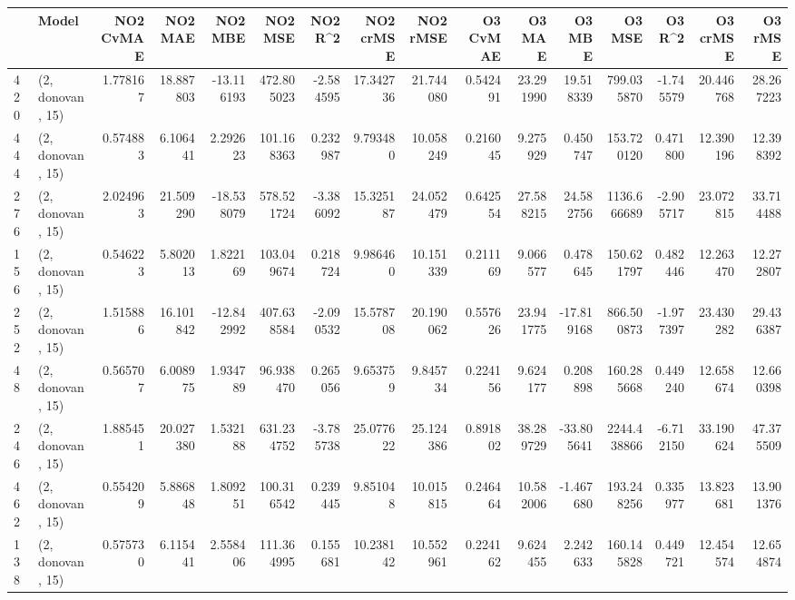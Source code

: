 \begin{tabular}{llrrrrrrrrrrrrrr}
\toprule
{} &             Model &  NO2 CvMAE &    NO2 MAE &    NO2 MBE &      NO2 MSE &    NO2 R\textasciicircum2 &  NO2 crMSE &   NO2 rMSE &  O3 CvMAE &     O3 MAE &     O3 MBE &       O3 MSE &     O3 R\textasciicircum2 &   O3 crMSE &    O3 rMSE \\
\midrule
420 &  (2, donovan, 15) &   1.778167 &  18.887803 & -13.116193 &   472.805023 &  -2.584595 &  17.342736 &  21.744080 &  0.542491 &  23.291990 &  19.518339 &   799.035870 &  -1.745579 &  20.446768 &  28.267223 \\
444 &  (2, donovan, 15) &   0.574883 &   6.106441 &   2.292623 &   101.168363 &   0.232987 &   9.793480 &  10.058249 &  0.216045 &   9.275929 &   0.450747 &   153.720120 &   0.471800 &  12.390196 &  12.398392 \\
276 &  (2, donovan, 15) &   2.024963 &  21.509290 & -18.538079 &   578.521724 &  -3.386092 &  15.325187 &  24.052479 &  0.642554 &  27.588215 &  24.582756 &  1136.666689 &  -2.905717 &  23.072815 &  33.714488 \\
156 &  (2, donovan, 15) &   0.546223 &   5.802013 &   1.822169 &   103.049674 &   0.218724 &   9.986460 &  10.151339 &  0.211169 &   9.066577 &   0.478645 &   150.621797 &   0.482446 &  12.263470 &  12.272807 \\
252 &  (2, donovan, 15) &   1.515886 &  16.101842 & -12.842992 &   407.638584 &  -2.090532 &  15.578708 &  20.190062 &  0.557626 &  23.941775 & -17.819168 &   866.500873 &  -1.977397 &  23.430282 &  29.436387 \\
48  &  (2, donovan, 15) &   0.565707 &   6.008975 &   1.934789 &    96.938470 &   0.265056 &   9.653759 &   9.845734 &  0.224156 &   9.624177 &   0.208898 &   160.285668 &   0.449240 &  12.658674 &  12.660398 \\
246 &  (2, donovan, 15) &   1.885451 &  20.027380 &   1.532188 &   631.234752 &  -3.785738 &  25.077622 &  25.124386 &  0.891802 &  38.289729 & -33.805641 &  2244.438866 &  -6.712150 &  33.190624 &  47.375509 \\
462 &  (2, donovan, 15) &   0.554209 &   5.886848 &   1.809251 &   100.316542 &   0.239445 &   9.851048 &  10.015815 &  0.246464 &  10.582006 &  -1.467680 &   193.248256 &   0.335977 &  13.823681 &  13.901376 \\
138 &  (2, donovan, 15) &   0.575730 &   6.115441 &   2.558406 &   111.364995 &   0.155681 &  10.238142 &  10.552961 &  0.224162 &   9.624455 &   2.242633 &   160.145828 &   0.449721 &  12.454574 &  12.654874 \\

\end{tabular}
